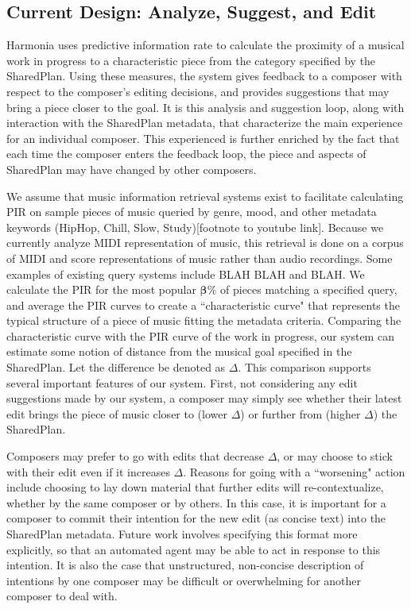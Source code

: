 \documentclass[final,authoryear,5p,times,twocolumn]{elsarticle}
\begin{document}
\subsection{Current Design: Analyze, Suggest, and Edit}

Harmonia uses predictive information rate to calculate the proximity of a musical work in progress to a characteristic piece from the category specified by the SharedPlan. Using these measures, the system gives feedback to a composer with respect to the composer's editing decisions, and provides suggestions that may bring a piece closer to the goal. It is this analysis and suggestion loop, along with interaction with the SharedPlan metadata, that characterize the main experience for an individual composer. This experienced is further enriched by the fact that each time the composer enters the feedback loop, the piece and aspects of SharedPlan may have changed by other composers.

We assume that music information retrieval systems exist to facilitate calculating PIR on sample pieces of music queried by genre, mood, and other metadata keywords (HipHop, Chill, Slow, Study)[footnote to youtube link]. Because we currently analyze MIDI representation of music, this retrieval is done on a corpus of MIDI and score representations of music rather than audio recordings. Some examples of existing query systems include BLAH BLAH and BLAH. We calculate the PIR for the most popular $\boldsymbol{\beta}\%$ of pieces matching a specified query, and average the PIR curves to create a ``characteristic curve" that represents the typical structure of a piece of music fitting the metadata criteria. 
Comparing the characteristic curve with the PIR curve of the work in progress, our system can estimate some notion of distance from the musical goal specified in the SharedPlan. Let the difference be denoted as $\Delta$. This comparison supports several important features of our system. First, not considering any edit suggestions made by our system, a composer may simply see whether their latest edit brings the piece of music closer to (lower $\Delta$) or further from (higher $\Delta$) the SharedPlan.  

Composers may prefer to go with edits that decrease $\Delta$, or may choose to stick with their edit even if it increases $\Delta$. Reasons for going with a ``worsening" action include choosing to lay down material that further edits will re-contextualize, whether by the same composer or by others. In this case, it is important for a composer to commit their intention for the new edit (as concise text) into the SharedPlan metadata. Future work involves specifying this format more explicitly, so that an automated agent may be able to act in response to this intention. It is also the case that unstructured, non-concise description of intentions by one composer may be difficult or overwhelming for another composer to deal with.
\end{document}
